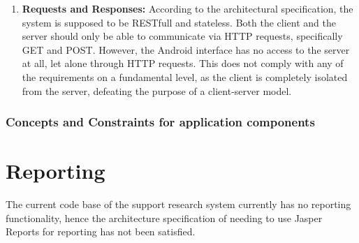 \documentclass[a4paper,10pt]{article}
\begin{document}
\begin{enumerate}
    	\item \textbf{Requests and Responses: } According to the architectural specification, the system is supposed to be RESTfull and stateless.
    	Both the client and the server should only be able to communicate via HTTP requests, specifically GET and POST.
    	However, the Android interface has no access to the server at all, let alone through HTTP requests.
    	This does not comply with any of the requirements on a fundamental level, as the client is completely isolated from the server, defeating the purpose of a client-server model.
    \end{enumerate}
    \subsubsection{Concepts and Constraints for application components}



\section{Reporting}
The current code base of the support research system currently has no reporting functionality, hence the architecture specification of needing to use Jasper Reports for reporting has not been satisfied.
\end{document}
